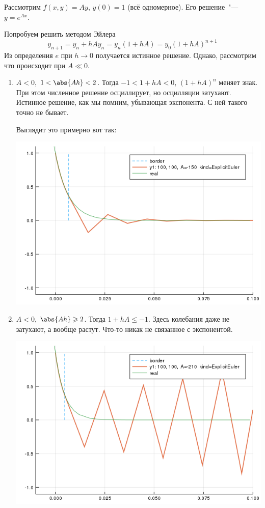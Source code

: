 \documentclass{trlnotes}
\begin{document}
\begin{exmp}\label{exmp:ode::stiff::linexpleuler}
  Рассмотрим $f(x, y) = A y$, $y(0)=1$ (всё одномерное). Его решение~"--- $y=e^{Ax}$.

  Попробуем решить методом Эйлера
  \[
    y_{n+1} = y_n + hAy_n = y_n (1+hA) = y_0 (1+hA)^{n+1}
  \]
  Из определения $e$ при $h\to 0$ получается истинное решение.
  Однако, рассмотрим что происходит при $A \ll 0$.
  \begin{enumerate}
    \item $A<0$, $1 < \abs{Ah}< 2$. 
      Тогда $-1 <1 + hA < 0$, $(1+hA)^n$ меняет знак. При этом численное решение осциллирует,
      но осцилляции затухают. Истинное решение, как мы помним, убывающая экспонента.
      С ней такого точно не бывает.

      Выглядит это примерно вот так:

      \includegraphics[width=0.5\pagewidth]{ode/stiff/exp-stiff-ExplicitEuler-1}

    \item  $A<0$, $\abs{Ah} \geqslant 2$. Тогда $1 + hA \leqslant -1$. Здесь колебания даже
      не затухают, а вообще растут. Что-то никак не связанное с экспонентой.

      \includegraphics[width=0.5\pagewidth]{ode/stiff/exp-stiff-ExplicitEuler-2}
  \end{enumerate} 
\end{exmp}
\end{document}
